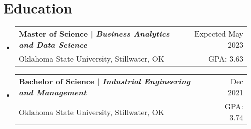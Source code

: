 \documentclass[letterpaper,12pt]{article} %
\makeatletter
\newcommand{\CVItem}[1]{
  \item\small{
    {#1 \vspace{-2pt}}
  }
}
\newcommand{\CVSubheading}[4]{
  \vspace{-2pt}\item
    \begin{tabular*}{0.97\textwidth}[t]{l@{\extracolsep{\fill}}r}
      \textbf{#1} & #2 \\
      \small#3 & \small #4 \\
    \end{tabular*}\vspace{-7pt}
}
\newcommand{\CVSubHeadingListStart}{\begin{itemize}[leftmargin=0.5cm, label={}]}
\newcommand{\CVSubHeadingListEnd}{\end{itemize}}
\newcommand{\CVItemListStart}{\begin{itemize}}
\newcommand{\CVItemListEnd}{\end{itemize}\vspace{-5pt}}
\makeatother
\begin{document}
\begin{comment}
This CV was written for specifically for positions I was applying for in
academia, and then modified to be a template.

A standard CV is about two pages long where as a resume in the US is one page.
sections can be added and removed here with this in mind. In my experience, 
education, and applicable work experience and skills are the most import things
to include on a resume. For a CV the Europass CV suggests the categories: Work
Experience, Education and Training, Language Skills, Digital Skills,
Communication and Interpersonal Skills, Conferences and Seminars, Creative Works
Driver's License, Hobbies and Interests, Honors and Awards, Management and
Leadership Skills, Networks and Memberships, Organizational Skills, Projects,
Publications, Recommendations, Social and Political Activities, Volunteering.

Your goal is to convey a who, what , when, where, why for every item you share. 
The who is obviously you, but I believe the rest should be done in that order.
For example below. An employer cares most about the degree held and typically 
less about the institution or where it is located (This is still good 
information though). Whatever order you choose be consistent throughout.
\end{comment}

\section{Education}
  \CVSubHeadingListStart
    
    \CVSubheading
      {{Master of Science $|$ \emph{\small{Business Analytics and Data Science}}}}{Expected May 2023}
      {Oklahoma State University, Stillwater, OK}{GPA: 3.63}
    \CVSubheading
      {{Bachelor of Science $|$ \emph{\small{Industrial Engineering and Management}}}}{Dec 2021}
      {Oklahoma State University, Stillwater, OK}{GPA: 3.74}
  \CVSubHeadingListEnd
\end{document}
